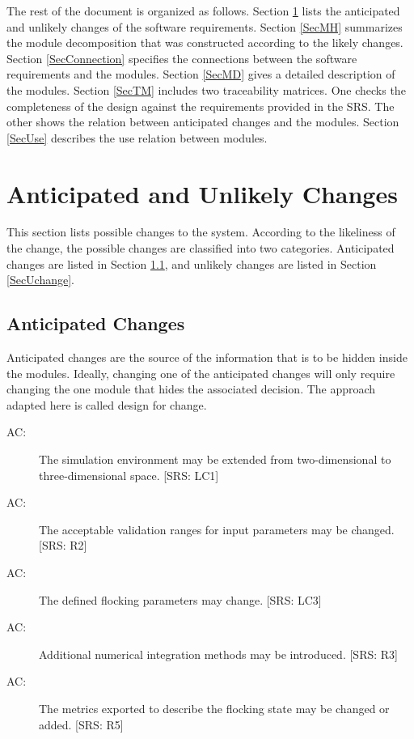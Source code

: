 \documentclass[12pt, titlepage]{article}
\newcounter{acnum}
\newcommand{\actheacnum}{AC\theacnum}
\begin{document}
The rest of the document is organized as follows. Section
\ref{SecChange} lists the anticipated and unlikely changes of the software
requirements. Section \ref{SecMH} summarizes the module decomposition that
was constructed according to the likely changes. Section \ref{SecConnection}
specifies the connections between the software requirements and the
modules. Section \ref{SecMD} gives a detailed description of the
modules. Section \ref{SecTM} includes two traceability matrices. One checks
the completeness of the design against the requirements provided in the SRS. The
other shows the relation between anticipated changes and the modules. Section
\ref{SecUse} describes the use relation between modules.

\section{Anticipated and Unlikely Changes} \label{SecChange}

This section lists possible changes to the system. According to the likeliness
of the change, the possible changes are classified into two
categories. Anticipated changes are listed in Section \ref{SecAchange}, and
unlikely changes are listed in Section \ref{SecUchange}.

\subsection{Anticipated Changes} \label{SecAchange}

Anticipated changes are the source of the information that is to be hidden
inside the modules. Ideally, changing one of the anticipated changes will only
require changing the one module that hides the associated decision. The approach
adapted here is called design for
change.

\begin{description}
\item[ \actheacnum \label{ac3DEnv}:] The simulation 
environment may be extended from two-dimensional to three-dimensional space. [SRS: LC1]
\item[ \actheacnum \label{acInputRange}:] The acceptable 
validation ranges for input parameters may be changed. [SRS: R2]
\item[ \actheacnum \label{acDefinedParam}:] The defined 
flocking parameters may change. [SRS: LC3]
\item[ \actheacnum \label{acODEMethod}:] Additional 
numerical integration methods may be introduced. [SRS: R3]
\item[ \actheacnum \label{acOutputMetrics}:] The metrics 
exported to describe the flocking state may be changed or added. [SRS: R5]
\end{description}
\end{document}
